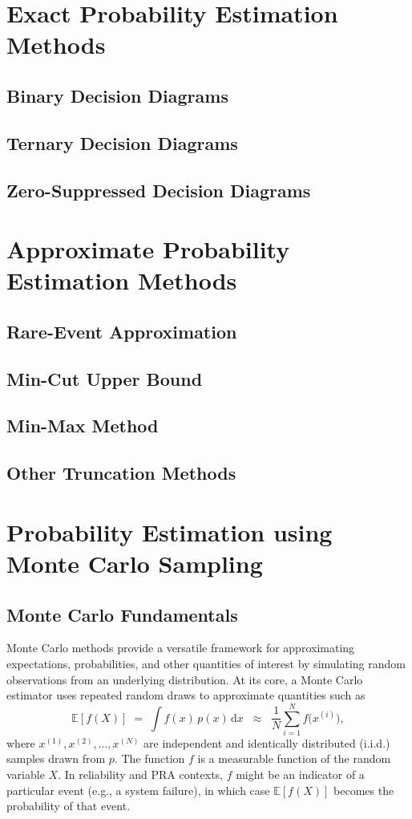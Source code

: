 \section{Exact Probability Estimation Methods}
\subsection{Binary Decision Diagrams}
\subsection{Ternary Decision Diagrams}
\subsection{Zero-Suppressed Decision Diagrams}

\section{Approximate Probability Estimation Methods}
\subsection{Rare-Event Approximation}
\subsection{Min-Cut Upper Bound}
\subsection{Min-Max Method}
\subsection{Other Truncation Methods}


\section{Probability Estimation using Monte Carlo Sampling}
\subsection{Monte Carlo Fundamentals}
Monte Carlo methods provide a versatile framework for approximating expectations, probabilities, and other quantities of interest by simulating random observations from an underlying distribution. At its core, a Monte Carlo estimator uses repeated random draws to approximate quantities such as
\begin{equation}
\label{eq:generic_monte_carlo_estimator}
\mathbb{E}[f(X)]
\;=\;
\int f(x)\,p(x)\,\mathrm{d}x
\;\;\approx\;\;
\frac{1}{N}\sum_{i=1}^N f\bigl(x^{(i)}\bigr),
\end{equation}
where \(x^{(1)},x^{(2)},\dots,x^{(N)}\) are independent and identically distributed (i.i.d.) samples drawn from \(p\). The function \(f\) is a measurable function of the random variable \(X\). In reliability and PRA contexts, \(f\) might be an indicator of a particular event (e.g., a system failure), in which case \(\mathbb{E}[f(X)]\) becomes the probability of that event.
